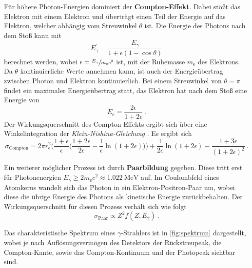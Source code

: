 Für höhere Photon-Energien dominiert der \textbf{Compton-Effekt}.
Dabei stößt das Elektron mit einem Elektron und überträgt einen Teil der Energie auf das Elektron,
welcher abhängig vom Streuwinkel $\theta$ ist.
Die Energie des Photons nach dem Stoß kann mit
\begin{equation*}
    E^{'}_{\gamma} = \frac{E_{\gamma}}{1 + \epsilon(1 - \cos{\theta})}
\end{equation*}
berechnet werden,
wobei $\epsilon = \sfrac{E_{\gamma}}{m_\text{e} c^2}$ ist,
mit der Ruhemasse $m_\text{e}$ des Elektrons.
Da $\theta$ kontinuierliche Werte annehmen kann,
ist auch der Energieübertrag zwischen Photon und Elektron kontinuierlich.
Bei einem Streuwinkel von $\theta = \pi$ findet ein maximaler Energieübertrag statt,
das Elektron hat nach dem Stoß eine Energie von
\begin{equation*}
    E_\text{e} = \frac{2 \epsilon}{1 + 2 \epsilon} \ .
\end{equation*}
Der Wirkungsquerschnitt des Compton-Effekts ergibt sich über eine Winkelintegration der \emph{Klein-Nishina-Gleichung} \cite{TODO}.
Es ergibt sich
\begin{equation}
    \sigma_\text{Compton} =
    2 \pi r^2_\text{e} \biggl(\frac{1+\epsilon}{\epsilon} \biggl(\frac{1+2\epsilon}{2\epsilon} - \frac{1}{\epsilon}\ln(1+2\epsilon)\biggr)\biggr)
    + \frac{1}{2\epsilon} \ln(1+2\epsilon) - \frac{1+3\epsilon}{(1+2\epsilon)^2} \ .
\end{equation}

Ein weiterer möglicher Prozess ist durch \textbf{Paarbildung} gegeben.
Diese tritt erst für Photonenergien $E_{\gamma} \geq 2 m_\text{e} c^2 \approx \SI{1.022}{\mega\eV}$ auf.
Im Coulombfeld eines Atomkerns wandelt sich das Photon in ein Elektron-Positron-Paar um,
wobei diese die übrige Energie des Photons als kinetische Energie zurückbehalten.
Der Wirkungsquerschnitt für diesen Prozess verhält sich wie folgt
\begin{equation*}
    \sigma_\text{Paar} \propto Z^2 f(Z, E_{\gamma}) \ .
\end{equation*}

Das charakteristische Spektrum eines $\gamma$-Strahlers ist in \autoref{fig:spektrum} dargestellt,
wobei je nach Auflösungsvermögen des Detektors der Rückstreupeak,
die Compton-Kante,
sowie das Compton-Kontinuum und der Photopeak sichtbar sind.

